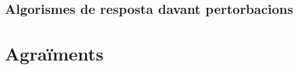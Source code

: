 \documentclass[12pt,a4paper,final,twoside]{article}
\begin{document}
\subsection{Algorismes de resposta davant pertorbacions}




\newpage
\section*{Agraïments}

\newpage


\label{Referencies}


\appendix
\clearpage %
\addappheadtotoc
\appendixpage
\end{document}
